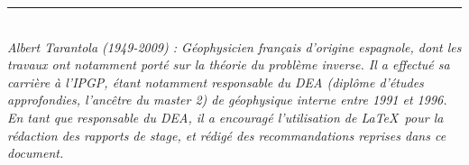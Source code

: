 \documentclass{ipgpmaster}
\begin{document}
\checkyears

\vspace*{5mm}




\def\author{Albert Tarantola}
\def\title{Le Rapport de Stage de Master}
\def\shorttitle{Rapport de stage}
\def\unit{IPGP}
\def\team{Dynamique des fluides géologiques \& Sismologie}
\def\spe{Géophysique ou autre} %
\def\supervisor{A. Fournier \& G. Moguilny}
\def\mydate{\today}
\def\keywords{Sciences de la Terre,  master, rapport, conseils}

\Entete


\begin{abstract}
Le stage de recherche du master est essentiel dans la formation d'un scientifique, 
car il permet un premier contact avec le monde de la recherche. 
La rédaction du rapport est une composante importante du stage.
Il doit être rédigé en suivant le style littéraire habituel des articles 
scientifiques, avec ses usages bien codifiés. 
Les différentes parties du rapport : 
\emph{Résumé, Introduction, Résultats, Discussion, Conclusion, Remerciements, 
Références bibliographiques,\/} et \emph{Annexes,\/} 
ont chacune des objectifs bien dé\-ter\-mi\-nés. 
On doit chercher la perfection dans la forme.
\end{abstract}

\vfill

\rule{\linewidth}{0.4pt}\\[3mm]
\textit{
Albert Tarantola (1949-2009) : Géophysicien français d'origine espagnole, dont les travaux ont notamment porté sur la théorie du problème
inverse. Il a effectué sa carrière à l'IPGP, étant notamment responsable du DEA (diplôme d'études approfondies, l'ancêtre du master 2) de géophysique interne entre
1991 et 1996. En tant que responsable du DEA, il a encouragé l'utilisation de \LaTeX\ pour la rédaction des
rapports de stage, et rédigé des recommandations reprises dans ce document.
}
\end{document}
